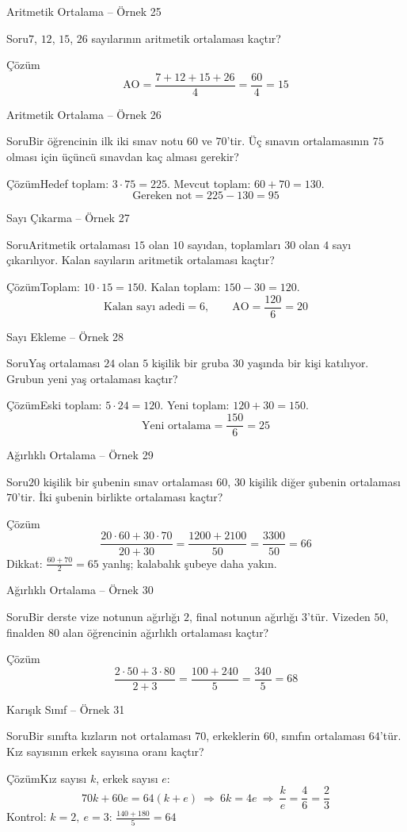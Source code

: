 \documentclass[aspectratio=169,11pt]{beamer}
\newcommand{\soru}[3]{%
\begin{frame}{#1}
  \begin{block}{Soru}\large #2\end{block}
  \pause
  \begin{exampleblock}{Çözüm}\large #3\end{exampleblock}
\end{frame}}
\begin{document}
\soru{Aritmetik Ortalama -- Örnek 25}
{\(7\), \(12\), \(15\), \(26\) sayılarının aritmetik ortalaması kaçtır?}
{\[\text{AO}=\frac{7+12+15+26}{4}=\frac{60}{4}=15\]}

\soru{Aritmetik Ortalama -- Örnek 26}
{Bir öğrencinin ilk iki sınav notu \(60\) ve \(70\)'tir. Üç sınavın ortalamasının \(75\) olması için üçüncü sınavdan kaç alması gerekir?}
{Hedef toplam: \(3\cdot 75=225\). \quad Mevcut toplam: \(60+70=130\).
\[\text{Gereken not}=225-130=95\]}

\soru{Sayı Çıkarma -- Örnek 27}
{Aritmetik ortalaması \(15\) olan \(10\) sayıdan, toplamları \(30\) olan \(4\) sayı çıkarılıyor. Kalan sayıların aritmetik ortalaması kaçtır?}
{Toplam: \(10\cdot 15=150\). \quad Kalan toplam: \(150-30=120\).
\[\text{Kalan sayı adedi}=6,\qquad \text{AO}=\frac{120}{6}=20\]}

\soru{Sayı Ekleme -- Örnek 28}
{Yaş ortalaması \(24\) olan \(5\) kişilik bir gruba \(30\) yaşında bir kişi katılıyor. Grubun yeni yaş ortalaması kaçtır?}
{Eski toplam: \(5\cdot 24=120\). \quad Yeni toplam: \(120+30=150\).
\[\text{Yeni ortalama}=\frac{150}{6}=25\]}

\soru{Ağırlıklı Ortalama -- Örnek 29}
{\(20\) kişilik bir şubenin sınav ortalaması \(60\), \(30\) kişilik diğer şubenin ortalaması \(70\)'tir. İki şubenin birlikte ortalaması kaçtır?}
{\[\frac{20\cdot 60+30\cdot 70}{20+30}=\frac{1200+2100}{50}=\frac{3300}{50}=66\]
Dikkat: \(\frac{60+70}{2}=65\) yanlış; kalabalık şubeye daha yakın.}

\soru{Ağırlıklı Ortalama -- Örnek 30}
{Bir derste vize notunun ağırlığı \(2\), final notunun ağırlığı \(3\)'tür. Vizeden \(50\), finalden \(80\) alan öğrencinin ağırlıklı ortalaması kaçtır?}
{\[\frac{2\cdot 50+3\cdot 80}{2+3}=\frac{100+240}{5}=\frac{340}{5}=68\]}

\soru{Karışık Sınıf -- Örnek 31}
{Bir sınıfta kızların not ortalaması \(70\), erkeklerin \(60\), sınıfın ortalaması \(64\)'tür. Kız sayısının erkek sayısına oranı kaçtır?}
{Kız sayısı \(k\), erkek sayısı \(e\):
\[70k+60e=64(k+e)\ \Rightarrow\ 6k=4e\ \Rightarrow\ \frac{k}{e}=\frac{4}{6}=\frac{2}{3}\]
Kontrol: \(k=2,\ e=3\): \(\frac{140+180}{5}=64\) \checkmark}
\end{document}
